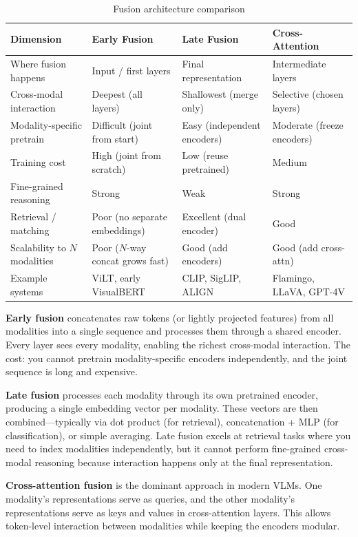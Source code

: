\begin{table}[H]
\centering
\caption{Fusion architecture comparison}
\begin{tabularx}{\textwidth}{lXXX}
\toprule
\textbf{Dimension} & \textbf{Early Fusion} & \textbf{Late Fusion} & \textbf{Cross-Attention} \\
\midrule
Where fusion happens & Input / first layers & Final representation & Intermediate layers \\
Cross-modal interaction & Deepest (all layers) & Shallowest (merge only) & Selective (chosen layers) \\
Modality-specific pretrain & Difficult (joint from start) & Easy (independent encoders) & Moderate (freeze encoders) \\
Training cost & High (joint from scratch) & Low (reuse pretrained) & Medium \\
Fine-grained reasoning & Strong & Weak & Strong \\
Retrieval / matching & Poor (no separate embeddings) & Excellent (dual encoder) & Good \\
Scalability to $N$ modalities & Poor ($N$-way concat grows fast) & Good (add encoders) & Good (add cross-attn) \\
Example systems & ViLT, early VisualBERT & CLIP, SigLIP, ALIGN & Flamingo, LLaVA, GPT-4V \\
\bottomrule
\end{tabularx}
\end{table}

\textbf{Early fusion} concatenates raw tokens (or lightly projected features) from all modalities into a single sequence and processes them through a shared encoder. Every layer sees every modality, enabling the richest cross-modal interaction. The cost: you cannot pretrain modality-specific encoders independently, and the joint sequence is long and expensive.

\textbf{Late fusion} processes each modality through its own pretrained encoder, producing a single embedding vector per modality. These vectors are then combined---typically via dot product (for retrieval), concatenation + MLP (for classification), or simple averaging. Late fusion excels at retrieval tasks where you need to index modalities independently, but it cannot perform fine-grained cross-modal reasoning because interaction happens only at the final representation.

\textbf{Cross-attention fusion} is the dominant approach in modern VLMs. One modality's representations serve as queries, and the other modality's representations serve as keys and values in cross-attention layers. This allows token-level interaction between modalities while keeping the encoders modular.

